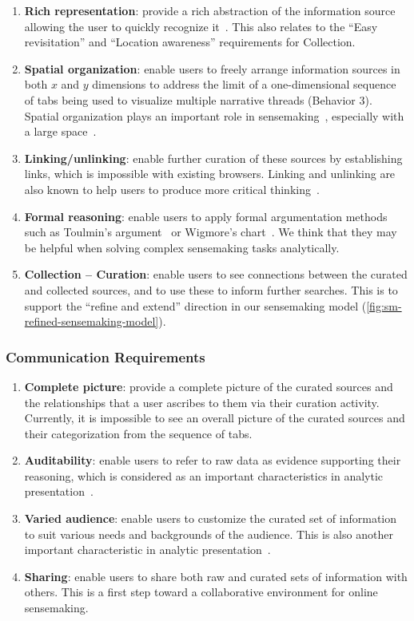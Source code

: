 \begin{enumerate}
	\setcounter{enumi}{\thelistnum}
	\item \textbf{Rich representation}: provide a rich abstraction of the information source allowing the user to quickly recognize it~\cite{Tauscher1997}. This also relates to the ``Easy revisitation'' and ``Location awareness'' requirements for Collection.
	\item \textbf{Spatial organization}: enable users to freely arrange information sources in both $x$ and $y$ dimensions to address the limit of a one-dimensional sequence of tabs being used to visualize multiple narrative threads (Behavior 3). Spatial organization plays an important role in sensemaking~\cite{Sedig2013}, especially with a large space~\cite{Andrews2010}.
	\item \textbf{Linking/unlinking}: enable further curation of these sources by establishing links, which is impossible with existing browsers. Linking and unlinking are also known to help users to produce more critical thinking~\cite{Sedig2013}.
	\item \textbf{Formal reasoning}: enable users to apply formal argumentation methods such as Toulmin's argument~\cite{Toulmin2003} or Wigmore's chart~\cite{Goodwin2000}. We think that they may be helpful when solving complex sensemaking tasks analytically.
	\item \textbf{Collection -- Curation}: enable users to see connections between the curated and collected sources, and to use these to inform further searches. This is to support the ``refine and extend'' direction in our sensemaking model (\autoref{fig:sm-refined-sensemaking-model}).

	\setcounter{listnum}{\theenumi}
\end{enumerate}

\subsubsection{Communication Requirements}

\begin{enumerate}
	\setcounter{enumi}{\thelistnum}
	\item \textbf{Complete picture}: provide a complete picture of the curated sources and the relationships that a user ascribes to them via their curation activity. Currently, it is impossible to see an overall picture of the curated sources and their categorization from the sequence of tabs.
	\item \textbf{Auditability}: enable users to refer to raw data as evidence supporting their reasoning, which is considered as an important characteristics in analytic presentation~\cite{Chinchor2009}.
	\item \textbf{Varied audience}: enable users to customize the curated set of information to suit various needs and backgrounds of the audience. This is also another important characteristic in analytic presentation~\cite{Chinchor2009}.
	\item \textbf{Sharing}: enable users to share both raw and curated sets of information with others. This is a first step toward a collaborative environment for online sensemaking.
\end{enumerate}